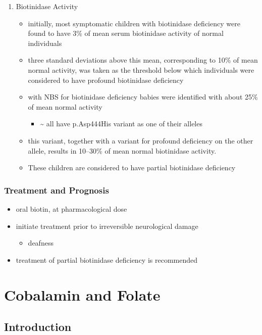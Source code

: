 \documentclass{scrartcl}
\begin{document}
\begin{enumerate}
\item Biotinidase Activity
\label{sec:org2fd2208}
\begin{itemize}
\item initially, most symptomatic children with biotinidase deficiency
were found to have 3\% of mean serum biotinidase activity of normal
individuals
\item three standard deviations above this mean, corresponding to 10\% of
mean normal activity, was taken as the threshold below which
individuals were considered to have profound biotinidase deficiency
\item with NBS for biotinidase deficiency babies were identified with about 25\% of mean normal activity
\begin{itemize}
\item \textasciitilde{} all have p.Asp444His variant as one of their alleles
\end{itemize}
\item this variant, together with a variant for profound deficiency on the
other allele, results in 10–30\% of mean normal biotinidase activity.
\item These children are considered to have partial biotinidase deficiency
\end{itemize}
\end{enumerate}

\subsubsection{Treatment and Prognosis}
\label{sec:orge1cdaa2}
\begin{itemize}
\item oral biotin, at pharmacological dose
\item initiate treatment prior to irreversible neurological damage
\begin{itemize}
\item deafness
\end{itemize}
\item treatment of partial biotinidase deficiency is recommended
\end{itemize}

\section{Cobalamin and Folate}
\label{sec:orgbf0ebac}
\subsection{Introduction}
\label{sec:orgbfaf472}
\end{document}
